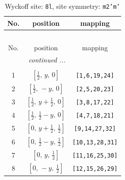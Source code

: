 \documentclass[fleqn,8pt]{jsarticle}
\begin{document}
\begin{longtable}{ccc}
\caption{Wyckoff site: {\tt 8l}, site symmetry: {\tt m2'm'}}
 \\
 \hline \hline
No. & position & mapping \\ \hline \endfirsthead

\multicolumn{2}{l}{\tablename\ \thetable{}} \\
 \hline \hline
No. & position & mapping \\ \hline \endhead

 \hline \hline
\multicolumn{2}{r}{\footnotesize\it continued ...} \\ \endfoot

 \hline \hline
\multicolumn{2}{r}{} \\ \endlastfoot

1 & $\left[ \frac{1}{2},\, y,\, 0 \right]$ & {\tt [1,6,19,24]} \\ \hline
2 & $\left[ \frac{1}{2},\, - y,\, 0 \right]$ & {\tt [2,5,20,23]} \\ \hline
3 & $\left[ \frac{1}{2},\, y + \frac{1}{2},\, 0 \right]$ & {\tt [3,8,17,22]} \\ \hline
4 & $\left[ \frac{1}{2},\, \frac{1}{2} - y,\, 0 \right]$ & {\tt [4,7,18,21]} \\ \hline
5 & $\left[ 0,\, y + \frac{1}{2},\, \frac{1}{2} \right]$ & {\tt [9,14,27,32]} \\ \hline
6 & $\left[ 0,\, \frac{1}{2} - y,\, \frac{1}{2} \right]$ & {\tt [10,13,28,31]} \\ \hline
7 & $\left[ 0,\, y,\, \frac{1}{2} \right]$ & {\tt [11,16,25,30]} \\ \hline
8 & $\left[ 0,\, - y,\, \frac{1}{2} \right]$ & {\tt [12,15,26,29]} \\
\end{longtable}
\renewcommand{\arraystretch}{1.2}
\end{document}
